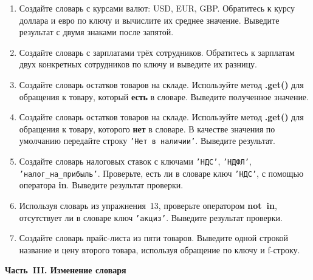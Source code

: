 \documentclass[a4,12pt]{article}
\theoremstyle{remark}
\begin{document}
\begin{enumerate}[resume]

    \item Создайте словарь с курсами валют: USD, EUR, GBP. Обратитесь к курсу доллара и евро по ключу и вычислите их среднее значение. Выведите результат с двумя знаками после запятой.

    \item Создайте словарь с зарплатами трёх сотрудников. Обратитесь к зарплатам двух конкретных сотрудников по ключу и выведите их разницу.

    \item Создайте словарь остатков товаров на складе. Используйте метод \textbf{.get()} для обращения к товару, который \textbf{есть} в словаре. Выведите полученное значение.

    \item Создайте словарь остатков товаров на складе. Используйте метод \textbf{.get()} для обращения к товару, которого \textbf{нет} в словаре. В качестве значения по умолчанию передайте строку \texttt{'Нет в наличии'}. Выведите результат.

    \item Создайте словарь налоговых ставок с ключами \texttt{'НДС'}, \texttt{'НДФЛ'}, \texttt{'налог\_на\_прибыль'}. Проверьте, есть ли в словаре ключ \texttt{'НДС'}, с помощью оператора \textbf{in}. Выведите результат проверки.

    \item Используя словарь из упражнения~13, проверьте оператором \textbf{not~in}, отсутствует ли в словаре ключ \texttt{'акциз'}. Выведите результат проверки.

    \item Создайте словарь прайс-листа из пяти товаров. Выведите одной строкой название и цену второго товара, используя обращение по ключу и f-строку.

\end{enumerate}

\bigskip
\noindent\textbf{Часть~III. Изменение словаря}
\end{document}
